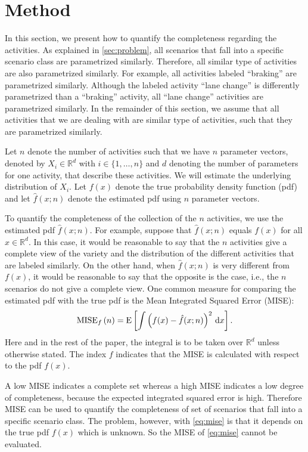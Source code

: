 \section{Method}
\label{sec:method}

In this section, we present how to quantify the completeness regarding the activities. As explained in \cref{sec:problem}, all scenarios that fall into a specific scenario class are parametrized similarly. Therefore, all similar type of activities are also parametrized similarly. For example, all activities labeled ``braking'' are parametrized similarly. Although the labeled activity ``lane change'' is differently parametrized than a ``braking'' activity, all ``lane change'' activities are parametrized similarly. In the remainder of this section, we assume that all activities that we are dealing with are similar type of activities, such that they are parametrized similarly. 

Let $n$ denote the number of activities such that we have $n$ parameter vectors, denoted by $X_i \in \mathbb{R}^d$ with $i\in \{1,\ldots,n\}$ and $d$ denoting the number of parameters for one activity, that describe these activities. We will estimate the underlying distribution of $X_i$. Let $f(x)$ denote the true probability density function (pdf) and let $\hat{f}(x;n)$ denote the estimated pdf using $n$ parameter vectors.

To quantify the completeness of the collection of the $n$ activities, we use the estimated pdf $\hat{f}(x;n)$. For example, suppose that $\hat{f}(x;n)$ equals $f(x)$ for all $x \in \mathbb{R}^d$. In this case, it would be reasonable to say that the $n$ activities give a complete view of the variety and the distribution of the different activities that are labeled similarly. On the other hand, when $\hat{f}(x;n)$ is very different from $f(x)$, it would be reasonable to say that the opposite is the case, i.e., the $n$ scenarios do not give a complete view. One common measure for comparing the estimated pdf with the true pdf is the Mean Integrated Squared Error (MISE):
\begin{equation}
	\label{eq:mise}
	\textup{MISE}_{f}\left( n \right) = \textup{E} \left[ \int \left( f(x) - \hat{f}(x;n) \right)^2 \mathrm{\,d} x \right].
\end{equation}
Here and in the rest of the paper, the integral is to be taken over $\mathbb{R}^d$ unless otherwise stated. The index $f$ indicates that the MISE is calculated with respect to the pdf $f(x)$.

A low MISE indicates a complete set whereas a high MISE indicates a low degree of completeness, because the expected integrated squared error is high. Therefore MISE can be used to quantify the completeness of set of scenarios that fall into a specific scenario class. The problem, however, with \cref{eq:mise} is that it depends on the true pdf $f(x)$ which is unknown. So the MISE of \cref{eq:mise} cannot be evaluated.

